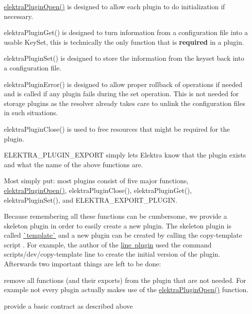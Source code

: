 \begin{DoxyItemize}
\item {\ttfamily \mbox{\hyperlink{elektra_2plugin_8c_a32a70a7876542c51d153164ac5108a57}{elektra\+Plugin\+Open()}}} is designed to allow each plugin to do initialization if necessary.
\item {\ttfamily elektra\+Plugin\+Get()} is designed to turn information from a configuration file into a usable {\ttfamily Key\+Set}, this is technically the only function that is {\bfseries{required}} in a plugin.
\item {\ttfamily elektra\+Plugin\+Set()} is designed to store the information from the keyset back into a configuration file.
\item {\ttfamily elektra\+Plugin\+Error()} is designed to allow proper rollback of operations if needed and is called if any plugin fails during the set operation. This is not needed for storage plugins as the resolver already takes care to unlink the configuration files in such situations.
\item {\ttfamily elektra\+Plugin\+Close()} is used to free resources that might be required for the plugin.
\item {\ttfamily E\+L\+E\+K\+T\+R\+A\+\_\+\+P\+L\+U\+G\+I\+N\+\_\+\+E\+X\+P\+O\+RT} simply lets Elektra know that the plugin exists and what the name of the above functions are.
\end{DoxyItemize}

Most simply put\+: most plugins consist of five major functions, {\ttfamily \mbox{\hyperlink{elektra_2plugin_8c_a32a70a7876542c51d153164ac5108a57}{elektra\+Plugin\+Open()}}}, {\ttfamily elektra\+Plugin\+Close()}, {\ttfamily elektra\+Plugin\+Get()}, {\ttfamily elektra\+Plugin\+Set()}, and {\ttfamily E\+L\+E\+K\+T\+R\+A\+\_\+\+E\+X\+P\+O\+R\+T\+\_\+\+P\+L\+U\+G\+IN}.

Because remembering all these functions can be cumbersome, we provide a skeleton plugin in order to easily create a new plugin. The skeleton plugin is called \mbox{\hyperlink{autotoc_md684_src_plugins_template_README_md}{\`{}template\`{}}} and a new plugin can be created by calling the copy-\/template script . For example, the author of the \mbox{\hyperlink{autotoc_md372_src_plugins_line_README_md}{line plugin}} used the command {\ttfamily scripts/dev/copy-\/template line} to create the initial version of the plugin. Afterwards two important things are left to be done\+:


\begin{DoxyItemize}
\item remove all functions (and their exports) from the plugin that are not needed. For example not every plugin actually makes use of the {\ttfamily \mbox{\hyperlink{elektra_2plugin_8c_a32a70a7876542c51d153164ac5108a57}{elektra\+Plugin\+Open()}}} function.
\item provide a basic contract as described above
\end{DoxyItemize}

